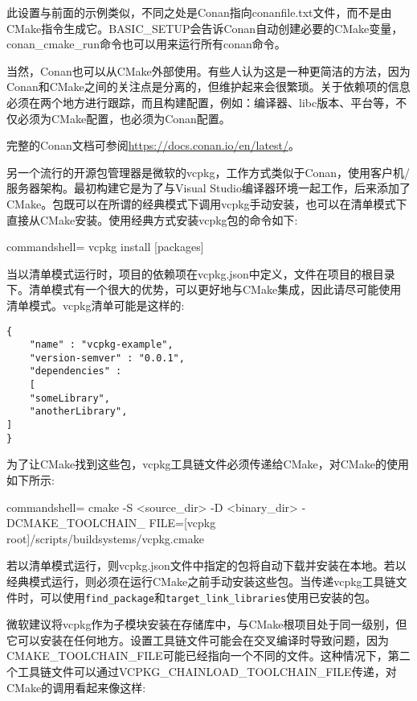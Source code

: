 此设置与前面的示例类似，不同之处是Conan指向conanfile.txt文件，而不是由CMake指令生成它。BASIC\_SETUP会告诉Conan自动创建必要的CMake变量，conan\_cmake\_run命令也可以用来运行所有conan命令。

当然，Conan也可以从CMake外部使用。有些人认为这是一种更简洁的方法，因为Conan和CMake之间的关注点是分离的，但维护起来会很繁琐。关于依赖项的信息必须在两个地方进行跟踪，而且构建配置，例如：编译器、libc版本、平台等，不仅必须为CMake配置，也必须为Conan配置。

完整的Conan文档可参阅\url{https://docs.conan.io/en/latest/}。


另一个流行的开源包管理器是微软的vcpkg，工作方式类似于Conan，使用客户机/服务器架构。最初构建它是为了与Visual Studio编译器环境一起工作，后来添加了CMake。包既可以在所谓的经典模式下调用vcpkg手动安装，也可以在清单模式下直接从CMake安装。使用经典方式安装vcpkg包的命令如下:

\begin{tcblisting}{commandshell={}}
vcpkg install [packages]
\end{tcblisting}

当以清单模式运行时，项目的依赖项在vcpkg.json中定义，文件在项目的根目录下。清单模式有一个很大的优势，可以更好地与CMake集成，因此请尽可能使用清单模式。vcpkg清单可能是这样的:

\begin{lstlisting}[style=styleCMake]
{
	"name" : "vcpkg-example",
	"version-semver" : "0.0.1",
	"dependencies" :
	[
	"someLibrary",
	"anotherLibrary",
] 
}
\end{lstlisting}

为了让CMake找到这些包，vcpkg工具链文件必须传递给CMake，对CMake的使用如下所示:

\begin{tcblisting}{commandshell={}}
cmake -S <source_dir> -D <binary_dir> -DCMAKE_TOOLCHAIN_
  FILE=[vcpkg root]/scripts/buildsystems/vcpkg.cmake
\end{tcblisting}

若以清单模式运行，则vcpkg.json文件中指定的包将自动下载并安装在本地。若以经典模式运行，则必须在运行CMake之前手动安装这些包。当传递vcpkg工具链文件时，可以使用\texttt{find\_package}和\texttt{target\_link\_libraries}使用已安装的包。

微软建议将vcpkg作为子模块安装在存储库中，与CMake根项目处于同一级别，但它可以安装在任何地方。设置工具链文件可能会在交叉编译时导致问题，因为CMAKE\_TOOLCHAIN\_FILE可能已经指向一个不同的文件。这种情况下，第二个工具链文件可以通过VCPKG\_CHAINLOAD\_TOOLCHAIN\_FILE传递，对CMake的调用看起来像这样:

